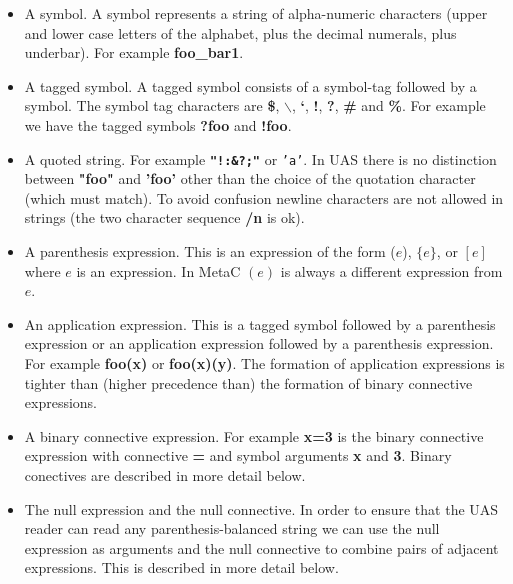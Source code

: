 \documentclass{article}
\begin{document}
\begin{itemize}
\item A symbol.  A symbol represents a string of alpha-numeric characters (upper and lower case letters of the alphabet, plus the decimal numerals, plus underbar).
  For example {\bf  foo\_bar1}.
\item A tagged symbol.  A tagged symbol consists of a symbol-tag followed by a symbol.  The symbol tag characters are {\bf \$}, {\bf $\backslash$}, {\bf `}, {\bf !}, {\bf ?}, {\bf \#} and {\bf \%}.
  For example we have the tagged symbols {\bf ?foo} and {\bf !foo}.
\item A quoted string.  For example {\bf \tt "!:\&?;"} or {\tt 'a'}.  In UAS there is no distinction between {\bf "foo"} and {\bf 'foo'} other than the choice of the quotation character (which must match).
  To avoid confusion newline characters are not allowed in strings (the two character sequence {\bf /n} is ok).
\item A parenthesis expression.  This is an expression of the form ($e$), $\{e\}$, or $[e]$ where $e$ is an expression.  In MetaC $(e)$ is always a different expression from $e$.
\item An application expression.  This is a tagged symbol followed by a parenthesis expression or an application expression followed by a parenthesis expression.  For example {\bf foo(x)} or {\bf foo(x)(y)}.
The formation of application expressions is tighter than (higher precedence than) the formation of binary connective expressions.
\item A binary connective expression.  For example {\bf x=3} is the binary connective expression with connective {\bf =} and symbol arguments {\bf x} and {\bf 3}.  Binary conectives are described in more detail below.
\item The null expression and the null connective. In order to ensure that the UAS reader can read any parenthesis-balanced string we can use the null
  expression as arguments and the null connective to combine pairs of adjacent expressions.  This is described in more detail below.
\end{itemize}
\end{document}
